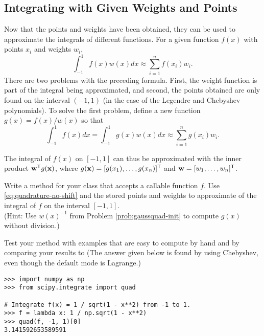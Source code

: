 \subsection*{Integrating with Given Weights and Points} %

Now that the points and weights have been obtained, they can be used to approximate the integrals of different functions.
For a given function $f(x)$ with points $x_i$ and weights $w_i$,
\[
\int_{-1}^{1} f(x) w(x) dx \approx \sum_{i=1}^n f(x_i)w_i.
\]
There are two problems with the preceding formula.
First, the weight function is part of the integral being approximated, and second, the points obtained are only found on the interval $(-1,1)$ (in the case of the Legendre and Chebyshev polynomials).
To solve the first problem, define a new function $g(x) = f(x) / w(x)$ so that
\begin{equation}
\int_{-1}^{1} f(x) dx
= \int_{-1}^{1} g(x) w(x) dx
\approx \sum_{i=1}^n g(x_i)w_i.
\label{eq:quadrature-no-shift}
\end{equation}

The integral of $f(x)$ on $[-1,1]$ can thus be approximated with the inner product $\mathbf{w}^{\mathsf T} g(\mathbf{x})$, where $g(\mathbf{x}) = [g(x_1),\dots,g(x_n)]^{\mathsf T}$ and $\mathbf{w} = [w_1,\dots,w_n]^{\mathsf T}$.

\begin{problem} %
Write a method for your class that accepts a callable function $f$.
Use \eqref{eq:quadrature-no-shift} and the stored points and weights to approximate of the integral of $f$ on the interval $[-1,1]$.
\\(Hint: Use $w(x)^{-1}$ from Problem \ref{prob:gaussquad-init} to compute $g(x)$ without division.)

Test your method with examples that are easy to compute by hand and by comparing your results to  (The answer given below is found by using Chebyshev, even though the default mode is Lagrange.)
\begin{lstlisting}
>>> import numpy as np
>>> from scipy.integrate import quad

# Integrate f(x) = 1 / sqrt(1 - x**2) from -1 to 1.
>>> f = lambda x: 1 / np.sqrt(1 - x**2)
>>> quad(f, -1, 1)[0]
3.141592653589591
\end{lstlisting}
\label{prob:gaussquad-no-shift}

\end{problem}

